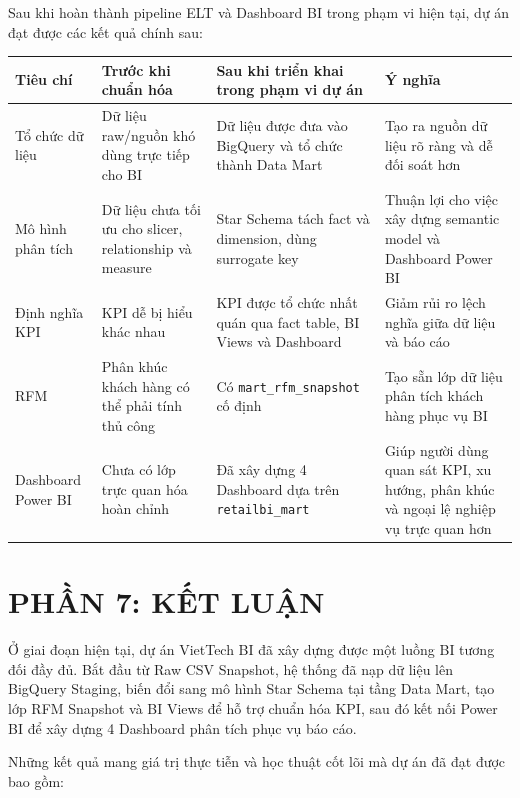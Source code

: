 \documentclass[12pt,a4paper]{article}
\newcommand{\code}[1]{\texttt{#1}}
\begin{document}
Sau khi hoàn thành pipeline ELT và Dashboard BI trong phạm vi hiện tại, dự án đạt được các kết quả chính sau:

\begin{table}[H]
\centering
{\scriptsize
\begin{tabularx}{\textwidth}{|p{}|p{}|p{}|Y|}
\hline
\textbf{Tiêu chí} & \textbf{Trước khi chuẩn hóa} & \textbf{Sau khi triển khai trong phạm vi dự án} & \textbf{Ý nghĩa} \\
\hline
Tổ chức dữ liệu & Dữ liệu raw/nguồn khó dùng trực tiếp cho BI & Dữ liệu được đưa vào BigQuery và tổ chức thành Data Mart & Tạo ra nguồn dữ liệu rõ ràng và dễ đối soát hơn \\
\hline
Mô hình phân tích & Dữ liệu chưa tối ưu cho slicer, relationship và measure & Star Schema tách fact và dimension, dùng surrogate key & Thuận lợi cho việc xây dựng semantic model và Dashboard Power BI \\
\hline
Định nghĩa KPI & KPI dễ bị hiểu khác nhau & KPI được tổ chức nhất quán qua fact table, BI Views và Dashboard & Giảm rủi ro lệch nghĩa giữa dữ liệu và báo cáo \\
\hline
RFM & Phân khúc khách hàng có thể phải tính thủ công & Có \code{mart\_rfm\_snapshot} cố định & Tạo sẵn lớp dữ liệu phân tích khách hàng phục vụ BI \\
\hline
Dashboard Power BI & Chưa có lớp trực quan hóa hoàn chỉnh & Đã xây dựng 4 Dashboard dựa trên \code{retailbi\_mart} & Giúp người dùng quan sát KPI, xu hướng, phân khúc và ngoại lệ nghiệp vụ trực quan hơn \\
\hline
\end{tabularx}
}
\end{table}

\section{PHẦN 7: KẾT LUẬN}

Ở giai đoạn hiện tại, dự án VietTech BI đã xây dựng được một luồng BI tương đối đầy đủ. Bắt đầu từ Raw CSV Snapshot, hệ thống đã nạp dữ liệu lên BigQuery Staging, biến đổi sang mô hình Star Schema tại tầng Data Mart, tạo lớp RFM Snapshot và BI Views để hỗ trợ chuẩn hóa KPI, sau đó kết nối Power BI để xây dựng 4 Dashboard phân tích phục vụ báo cáo.

Những kết quả mang giá trị thực tiễn và học thuật cốt lõi mà dự án đã đạt được bao gồm:
\end{document}
